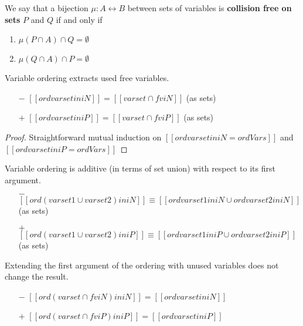 \begin{definition} 
  We say that a bijection $\mu : A \leftrightarrow B$ between sets of
  variables is \textbf{collision free on sets} $P$ and $Q$ if and only if
  \begin{enumerate}
    \item $\mu(P \cap A) \cap Q = \emptyset$
    \item $\mu(Q \cap A) \cap P = \emptyset$
  \end{enumerate}
\end{definition}


\begin{lemma}
  \label{lemma:ord-soundness}
  Variable ordering extracts used free variables.
  \begin{itemize}
    \item[$-$] $[[ {ord varset in iN} ]] = [[varset ∩ fv iN]]$ (as sets)
    \item[$+$] $[[ {ord varset in iP} ]] = [[varset ∩ fv iP]]$ (as sets)
  \end{itemize}
\end{lemma}
\begin{proof}
  Straightforward mutual induction on 
  $[[ ord varset in iN = ordVars ]]$ and $[[ ord varset in iP = ordVars ]]$
\end{proof}


\begin{corollary}
  \label{corollary:ord-additivity}
  Variable ordering is additive (in terms of set union) with respect to its first argument.
  \begin{itemize}
    \item[$-$] $[[ {ord (varset1 ∪ varset2) in iN} ]]
                \equiv
                [[{ord varset1 in iN} ∪ {ord varset2 in iN}]]$ (as sets)
    \item[$+$] $[[{ord (varset1 ∪ varset2) in iP}]]
                \equiv
                [[{ord varset1 in iP} ∪ {ord varset2 in iP}]]$ (as sets)

  \end{itemize}
\end{corollary}

\begin{corollary}
  \label{corollary:ord-weakening}
  Extending the first argument of the ordering with unused variables does not
  change the result.
  \begin{itemize}
    \item[$-$] $[[ ord (varset ∩ fv iN) in iN ]] = [[ ord varset in iN ]]$
    \item[$+$] $[[ ord (varset ∩ fv iP) in iP ]] = [[ ord varset in iP ]]$
  \end{itemize}
\end{corollary}

